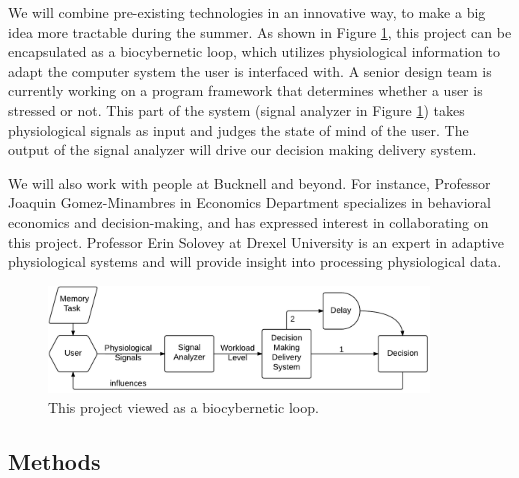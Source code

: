 \documentclass[12pt]{article}
\begin{document}
We will combine pre-existing technologies in an innovative way, to make a big idea more tractable during the summer. As shown in Figure \ref{figure:mindmap}, this project can be encapsulated as a biocybernetic loop, which utilizes physiological information to adapt the computer system the user is interfaced with. A senior design team is currently working on a program framework that determines whether a user is stressed or not. This part of the system (signal analyzer in Figure \ref{figure:mindmap}) takes physiological signals as input and judges the state of mind of the user. The output of the signal analyzer will drive our decision making delivery system.

We will also work with people at Bucknell and beyond. For instance, Professor Joaquin Gomez-Minambres in Economics Department specializes in behavioral economics and decision-making, and has expressed interest in collaborating on this project. Professor Erin Solovey at Drexel University is an expert in adaptive physiological systems and will provide insight into processing physiological data.

\begin{figure}[h]
\centering
\includegraphics[width=0.9\textwidth]{hci_mindmap.pdf}
\caption{This project viewed as a biocybernetic loop.}
\label{figure:mindmap}
\end{figure}




\subsection{Methods}\label{methods}
\end{document}
